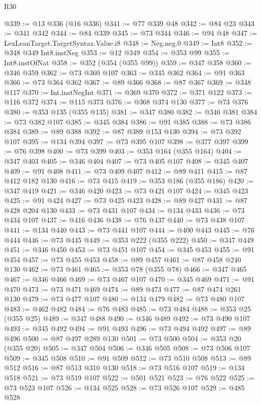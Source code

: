 \begin{lexlean}{R30}
\begin{coremodule}
@339 := @13 @336 (@16 @336)
@341 := @77 @339 @48
@342 := @84 @23
@343 := @341 @342
@344 := @84 @339
@345 := @73 @344
@346 := @94 @48
@347 := LexLeanTarget.TargetSyntax.Value.i8
@348 := Neg.neg.{0}
@349 := Int8
@352 := @348 @349 Int8.instNeg
@353 := @12 @349
@354 := @353 @99
@355 := Int8.instOfNat
@358 := @352 (@354 (@355 @99))
@359 := @347 @358
@360 := @346 @359
@362 := @73 @360 @107
@363 := @345 @362
@364 := @91 @363
@366 := @73 @364 @362
@367 := @89 @366
@368 := @87 @367
@369 := @348 @117
@370 := Int.instNegInt
@371 := @369 @370
@372 := @371 @122
@373 := @116 @372
@374 := @115 @373
@376 := @368 @374 @130
@377 := @73 @376
@380 := @353 @135 (@355 @135)
@381 := @347 @380
@382 := @346 @381
@384 := @73 @382 @107
@385 := @345 @384
@386 := @91 @385
@388 := @73 @386 @384
@389 := @89 @388
@392 := @87 @389 @153 @130
@394 := @73 @392 @107
@395 := @134 @394
@397 := @73 @395 @107
@398 := @377 @397
@399 := @76 @398
@400 := @73 @399
@403 := @353 @164 (@355 @164)
@404 := @347 @403
@405 := @346 @404
@407 := @73 @405 @107
@408 := @345 @407
@409 := @91 @408
@411 := @73 @409 @407
@412 := @89 @411
@415 := @87 @412 @182 @130
@416 := @73 @415
@419 := @353 @186 (@355 @186)
@420 := @347 @419
@421 := @346 @420
@423 := @73 @421 @107
@424 := @345 @423
@425 := @91 @424
@427 := @73 @425 @423
@428 := @89 @427
@431 := @87 @428 @204 @130
@433 := @73 @431 @107
@434 := @134 @433
@436 := @73 @434 @107
@437 := @416 @436
@438 := @76 @437
@440 := @73 @438 @107
@441 := @134 @440
@443 := @73 @441 @107
@444 := @400 @443
@445 := @76 @444
@446 := @73 @445
@449 := @353 @222 (@355 @222)
@450 := @347 @449
@451 := @346 @450
@453 := @73 @451 @107
@454 := @345 @453
@455 := @91 @454
@457 := @73 @455 @453
@458 := @89 @457
@461 := @87 @458 @240 @130
@462 := @73 @461
@465 := @353 @78 (@355 @78)
@466 := @347 @465
@467 := @346 @466
@469 := @73 @467 @107
@470 := @345 @469
@471 := @91 @470
@473 := @73 @471 @469
@474 := @89 @473
@477 := @87 @474 @261 @130
@479 := @73 @477 @107
@480 := @134 @479
@482 := @73 @480 @107
@483 := @462 @482
@484 := @76 @483
@485 := @73 @484
@488 := @353 @25 (@355 @25)
@489 := @347 @488
@490 := @346 @489
@492 := @73 @490 @107
@493 := @345 @492
@494 := @91 @493
@496 := @73 @494 @492
@497 := @89 @496
@500 := @87 @497 @289 @130
@501 := @73 @500
@504 := @353 @20 (@355 @20)
@505 := @347 @504
@506 := @346 @505
@508 := @73 @506 @107
@509 := @345 @508
@510 := @91 @509
@512 := @73 @510 @508
@513 := @89 @512
@516 := @87 @513 @310 @130
@518 := @73 @516 @107
@519 := @134 @518
@521 := @73 @519 @107
@522 := @501 @521
@523 := @76 @522
@525 := @73 @523 @107
@526 := @134 @525
@528 := @73 @526 @107
@529 := @485 @528

\end{coremodule}
\end{lexlean}

